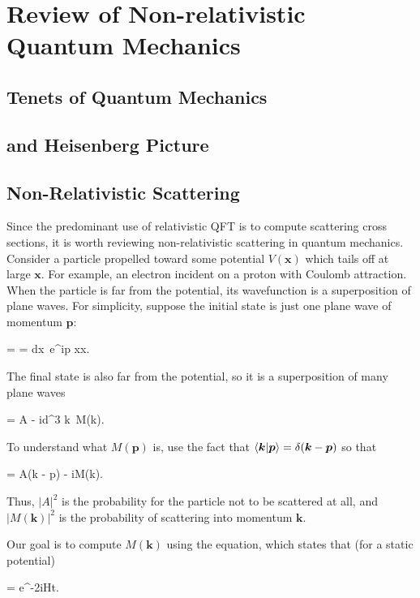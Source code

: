 \chapter{Review of Non-relativistic Quantum Mechanics}

\section{Tenets of Quantum Mechanics}

\section{\Schrodinger and Heisenberg Picture}

\section{Non-Relativistic Scattering}

Since the predominant use of relativistic QFT is to compute scattering cross sections, it is worth reviewing non-relativistic scattering in quantum mechanics. Consider a particle propelled toward some potential $V(\bm x)$ which tails off at large $\bm x$. For example, an electron incident on a proton with Coulomb attraction. When the particle is far from the potential, its wavefunction is a superposition of plane waves. For simplicity, suppose the initial state is just one plane wave of momentum $\bm p$:
\begin{e}
   =  = \int dx\, e^{i\bm p \cdot x}\ket x.
  \label{eqn:non-rel-scattering-initial}
\end{e}
The final state is also far from the potential, so it is a superposition of many plane waves
\begin{e}
   = A  - i\int d^3 \bm k\,  M(\bm k).
  \label{eqn:non-rel-scattering-final}
\end{e}
To understand what $M(\bm p)$ is, use the fact that $\braket{\bm k|\bm p} = \delta(\bm k - \bm p)$ so that
\begin{e}
   = A\delta(\bm k - \bm p) - iM(\bm k).
  \label{eqn:non-rel-scattering-m-def}
\end{e}
Thus, $|A|^2$ is the probability for the particle not to be scattered at all, and $|M(\bm k)|^2$ is the probability of scattering into momentum $\bm k$.

Our goal is to compute $M(\bm k)$ using the \Schrodinger equation, which states that (for a static potential)
\begin{e}
   = e^{-2iHt}.
  \label{eqn:non-rel-scattering-schrodinger}
\end{e}

